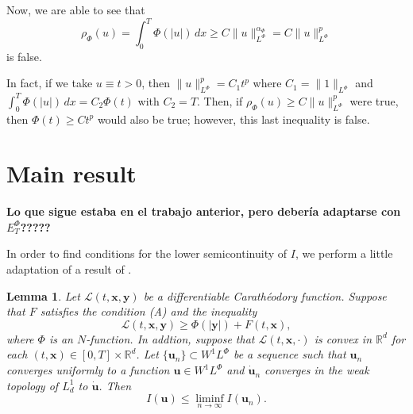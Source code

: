 \documentclass[twoside]{article}
\newtheorem{lem}[thm]{Lemma}
\theoremstyle{remark}
\newcommand{\orlnor}{\|_{L^{\Phi}}}
\newcommand{\lphi}{L^{\Phi}}
\newcommand{\ephi}{E^{\Phi}}
\newcommand{\wphi}{W^{1}\lphi}
\renewcommand{\b}[1]{\boldsymbol{#1}}
\newcommand{\rr}{\mathbb{R}}
\renewcommand{\leq}{\leqslant}
\renewcommand{\geq}{\geqslant}
\begin{document}
Now, we are able to see that 
\[
\rho_{\Phi}(u)=\int_0^T \Phi(|u|)\,dx\geq C\|u\orlnor^{\alpha_{\Phi}}=C\|u\orlnor^p
\]
is false.

In fact, if we take $u\equiv t>0$, then $\|u\orlnor^p=C_1t^p$ where $C_1=\|1\orlnor$ and
$\int_0^T \Phi(|u|)\,dx=C_2\Phi(t)$ with $C_2=T$. 
Then, if $\rho_{\Phi}(u)\geq C\|u\orlnor^p$ were true, then $\Phi(t)\geq C t^p$ would also be true; however, this
last inequality is false.
 

\section{Main result}\label{sec:main}


{\bf Lo que sigue estaba en el trabajo anterior, pero deber\'ia adaptarse con $\ephi_T$?????}

In order to find conditions for the lower semicontinuity of  $I$, 
we perform a little adaptation of  a result of \cite{ekeland1999convex}. 


\begin{lem}\label{semicontinf}
Let $\mathcal{L}(t,\b{x},\b{y})$ be a  differentiable Carath\'eodory function. Suppose that  $F$ satisfies the condition (A) and the inequality
\begin{equation}\label{cota_inf_2}
\mathcal{L}(t,\b{x},\b{y})\geq \Phi\left(|\b{y}|\right)+ F(t,\b{x}),
\end{equation}
where $\Phi$ is an $N$-function. 
In addtion, suppose that  $\mathcal{L}(t,\b{x},\cdot)$ is convex in $\rr^d$ for each $(t,\b{x})\in [0,T]\times\rr^d$.  Let $\{\b{u}_n\}\subset\wphi$ be a sequence such that $\b{u}_n$ converges  uniformly  to a function $\b{u}\in\wphi$ and $\b{\dot{u}}_n$ converges in the weak topology of $L^1_d$ to $\b{\dot{u}}$.   Then
\begin{equation}\label{liminf0}I(\b{u})\leq \liminf_{n\to\infty}I(\b{u}_n).
\end{equation}

\end{lem}
\end{document}
